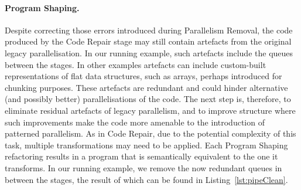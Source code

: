 \paragraph{Program Shaping.}
Despite correcting those errors introduced during Parallelism Removal, the code produced by the Code Repair stage may still contain artefacts from the original legacy parallelisation. In our running example, such artefacts include the queues between the stages.
%
In other examples artefacts can include custom-built representations of flat data structures, such as arrays, perhaps introduced for chunking purposes.
%
These artefacts are redundant and could hinder alternative (and possibly better) parallelisations of the code. The next step is, therefore, to eliminate residual artefacts of legacy parallelism, and to improve structure where such improvements make the code more amenable to the introduction of patterned parallelism.
%
As in Code Repair, due to the potential complexity of this task, multiple transformations may need to be applied.
%
Each Program Shaping refactoring results in a program that is semantically equivalent to the one it transforms.
%
In our running example, we remove the now redundant queues in between the stages, the result of which can be found in Listing~\ref{lst:pipeClean}.


